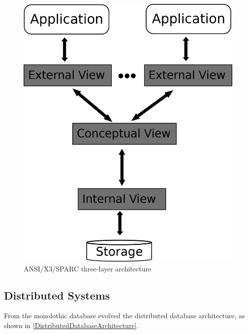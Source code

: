 \begin{figure}[H]
	\begin{center}
		\includegraphics[scale=0.5]{figures/monolithicalDatabaseArchitecture.png}
	\end{center}
	\caption{ANSI/X3/SPARC three-layer architecture \cite[p. 85]{DBLP:books/dp/LeserN2006}}
	\label{MonolithicDatabaseArchitecture}
\end{figure} 


\subsection{Distributed Systems}

From the monolothic database evolved the distributed database architecture, as shown in \ref{DistributedDatabaseArchitecture}.

